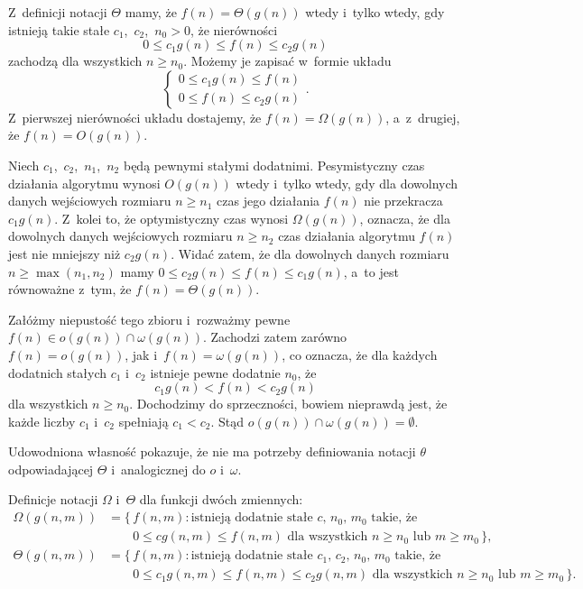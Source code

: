 \exercise %
Z~definicji notacji $\Theta$ mamy, że $f(n)=\Theta(g(n))$ wtedy i~tylko wtedy, gdy istnieją takie stałe $c_1$,~$c_2$,~$n_0>0$, że nierówności
\[
	0 \le c_1g(n) \le f(n) \le c_2g(n)
\]
zachodzą dla wszystkich $n\ge n_0$. Możemy je zapisać w~formie układu
\[
	\begin{cases}
		0 \le c_1g(n) \le f(n) \\
		0 \le f(n) \le c_2g(n)
	\end{cases}.
\]
Z~pierwszej nierówności układu dostajemy, że $f(n)=\Omega(g(n))$, a~z~drugiej, że $f(n)=O(g(n))$.

\exercise %
Niech $c_1$,~$c_2$,~$n_1$,~$n_2$ będą pewnymi stałymi dodatnimi. Pesymistyczny czas działania algorytmu wynosi $O(g(n))$ wtedy i~tylko wtedy, gdy dla dowolnych danych wejściowych rozmiaru $n\ge n_1$ czas jego działania $f(n)$ nie przekracza $c_1g(n)$. Z~kolei to, że optymistyczny czas wynosi $\Omega(g(n))$, oznacza, że dla dowolnych danych wejściowych rozmiaru $n\ge n_2$ czas działania algorytmu $f(n)$ jest nie mniejszy niż $c_2g(n)$. Widać zatem, że dla dowolnych danych rozmiaru $n\ge\max(n_1,n_2)$ mamy $0\le c_2g(n)\le f(n)\le c_1g(n)$, a~to jest równoważne z~tym, że $f(n)=\Theta(g(n))$.

\exercise %
Załóżmy niepustość tego zbioru i~rozważmy pewne $f(n)\in o(g(n))\cap\omega(g(n))$. Zachodzi zatem zarówno $f(n)=o(g(n))$, jak i~$f(n)=\omega(g(n))$, co oznacza, że dla każdych dodatnich stałych $c_1$ i~$c_2$ istnieje pewne dodatnie $n_0$, że
\[
	c_1g(n) < f(n) < c_2g(n)
\]
dla wszystkich $n\ge n_0$. Dochodzimy do sprzeczności, bowiem nieprawdą jest, że każde liczby $c_1$ i~$c_2$ spełniają $c_1<c_2$. Stąd $o(g(n))\cap\omega(g(n))=\emptyset$.

Udowodniona własność pokazuje, że nie ma potrzeby definiowania notacji $\theta$ odpowiadającej $\Theta$ i~analogicznej do $o$ i~$\omega$.

\exercise %

\noindent Definicje notacji $\Omega$ i~$\Theta$ dla funkcji dwóch zmiennych:
\[
	\begin{split}
		\Omega(g(n,m)) &= \bigl\{\,f(n,m):\text{istnieją dodatnie stałe $c$,~$n_0$,~$m_0$ takie, że} \\
		&\qquad 0 \le cg(n,m) \le f(n,m) \text{ dla wszystkich $n \ge n_0$ lub $m \ge m_0$}\,\bigr\}, \\[2mm]
		\Theta(g(n,m)) &= \bigl\{\,f(n,m):\text{istnieją dodatnie stałe $c_1$,~$c_2$,~$n_0$,~$m_0$ takie, że} \\
		&\qquad 0 \le c_1g(n,m) \le f(n,m) \le c_2g(n,m) \text{ dla wszystkich $n \ge n_0$ lub $m \ge m_0$}\,\bigr\}.
	\end{split}
\]

